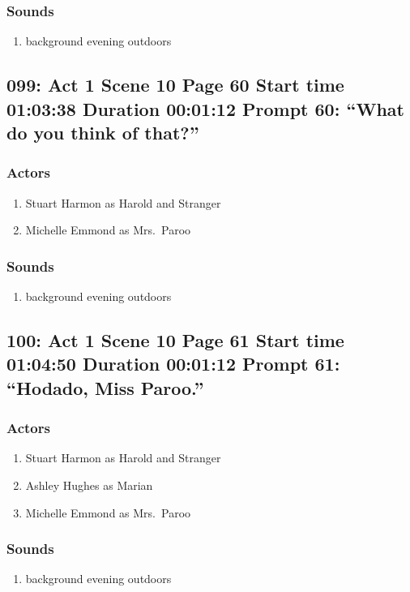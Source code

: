 \subsubsection{Sounds}
\begin{enumerate}
\item background evening outdoors
\end{enumerate}
\subsection{099: Act 1 Scene 10 Page 60 Start time 01:03:38 Duration 00:01:12 Prompt 60: ``What do you think of that?''}

\subsubsection{Actors}
\begin{enumerate}
\item Stuart Harmon as Harold and Stranger
\item Michelle Emmond as Mrs.~Paroo
\end{enumerate}

\subsubsection{Sounds}
\begin{enumerate}
\item background evening outdoors
\end{enumerate}
\subsection{100: Act 1 Scene 10 Page 61 Start time 01:04:50 Duration 00:01:12 Prompt 61: ``Hodado, Miss Paroo.''}

\subsubsection{Actors}
\begin{enumerate}
\item Stuart Harmon as Harold and Stranger
\item Ashley Hughes as Marian
\item Michelle Emmond as Mrs.~Paroo
\end{enumerate}

\subsubsection{Sounds}
\begin{enumerate}
\item background evening outdoors
\end{enumerate}
